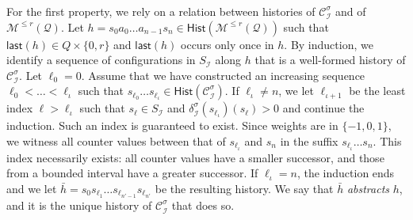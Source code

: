 \documentclass[a4paper,UKenglish,cleveref,autoref,thm-restate,colorlinks]{lipics-v2021}
\newcommand{\mdp}{\mathcal{M}}
\newcommand{\mdpStateSpace}{S}
\newcommand{\mdpTrans}{\delta}
\newcommand{\histSet}[1]{\mathsf{Hist}(#1)}
\newcommand{\hist}{h}
\newcommand{\last}[1]{\mathsf{last}(#1)}
\newcommand{\indexPosition}{\ell}
\newcommand{\subindexPosition}{\iota}
\newcommand{\indexLast}{n}
\newcommand{\ocmdp}{\mathcal{Q}}
\newcommand{\ocmdpFin}[2]{\mdp^{\leq #2}(#1)}
\newcommand{\ocStateSpace}{Q}
\newcommand{\ocConfig}{s}
\newcommand{\ocAction}{a}
\newcommand{\counterUB}{r}
\newcommand{\mchain}{\mathcal{C}}
\newcommand{\intPart}{\mathcal{I}}
\newcommand{\compressChainStrat}[1]{\mchain^{#1}_{\intPart}}
\newcommand{\compressChain}{\compressChainStrat{\strat}}
\newcommand{\compressChainStateSpace}{\mdpStateSpace_{\intPart}}
\newcommand{\compressChainTransTemplate}[2]{\mdpTrans^{#1}_{#2}}
\newcommand{\compressChainTrans}{\compressChainTransTemplate{\strat}{\intPart}}
\newcommand{\mcHist}{\bar{\hist}}
\newcommand{\stratGeneric}[1]{{\sigma_{#1}}}
\newcommand{\strat}{\stratGeneric{}}
\begin{document}
For the first property, we rely on a relation between histories of $\compressChain$ and of $\ocmdpFin{\ocmdp}{\counterUB}$.
Let $\hist = \ocConfig_0\ocAction_0\ldots\ocAction_{\indexLast-1}\ocConfig_\indexLast\in\histSet{\ocmdpFin{\ocmdp}{\counterUB}}$ such that $\last{\hist}\in\ocStateSpace\times\{0, \counterUB\}$ and $\last{\hist}$ occurs only once in $\hist$.
By induction, we identify a sequence of configurations in $\compressChainStateSpace$ along $\hist$ that is a well-formed history of $\compressChain$.
Let $\indexPosition_0 = 0$.
Assume that we have constructed an increasing sequence $\indexPosition_0 <\ldots < \indexPosition_\subindexPosition$ such that $\ocConfig_{\indexPosition_0}\ldots\ocConfig_{\indexPosition_\subindexPosition}\in\histSet{\compressChain}$.
If $\indexPosition_\subindexPosition\neq\indexLast$, we let $\indexPosition_{\subindexPosition+1}$ be the least index $\indexPosition > \indexPosition_{\subindexPosition}$ such that $\ocConfig_\indexPosition\in\compressChainStateSpace$ and  $\compressChainTrans(\ocConfig_{\indexPosition_{\subindexPosition}})(\ocConfig_{\indexPosition}) > 0$ and continue the induction.
Such an index is guaranteed to exist.
Since weights are in $\{-1, 0, 1\}$, we witness all counter values between that of $\ocConfig_{\indexPosition_\subindexPosition}$ and $\ocConfig_\indexLast$ in the suffix $\ocConfig_{\indexPosition_\subindexPosition}\ldots\ocConfig_\indexLast$.
This index necessarily exists: all counter values have a smaller successor, and those from a bounded interval have a greater successor.
If $\indexPosition_{\subindexPosition}=\indexLast$, the induction ends and we let $\mcHist = \ocConfig_0\ocConfig_{\indexPosition_1}\ldots\ocConfig_{\indexPosition_{\indexLast'-1}}\ocConfig_{\indexPosition_{\indexLast'}}$ be the resulting history.
We say that $\mcHist$ \textit{abstracts} $\hist$, and it is the unique history of $\compressChain$ that does so.
\end{document}

